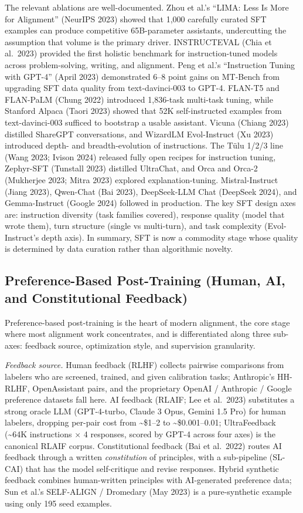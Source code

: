 The relevant ablations are well-documented. Zhou et al.'s ``LIMA: Less Is More for Alignment'' (NeurIPS 2023) showed that 1,000 carefully curated SFT examples can produce competitive 65B-parameter assistants, undercutting the assumption that volume is the primary driver. INSTRUCTEVAL (Chia et al.~2023) provided the first holistic benchmark for instruction-tuned models across problem-solving, writing, and alignment. Peng et al.'s ``Instruction Tuning with GPT-4'' (April 2023) demonstrated 6--8 point gains on MT-Bench from upgrading SFT data quality from text-davinci-003 to GPT-4. FLAN-T5 and FLAN-PaLM (Chung 2022) introduced 1,836-task multi-task tuning, while Stanford Alpaca (Taori 2023) showed that 52K self-instructed examples from text-davinci-003 sufficed to bootstrap a usable assistant. Vicuna (Chiang 2023) distilled ShareGPT conversations, and WizardLM Evol-Instruct (Xu 2023) introduced depth- and breadth-evolution of instructions. The Tülu 1/2/3 line (Wang 2023; Ivison 2024) released fully open recipes for instruction tuning, Zephyr-SFT (Tunstall 2023) distilled UltraChat, and Orca and Orca-2 (Mukherjee 2023; Mitra 2023) explored explanation-tuning. Mistral-Instruct (Jiang 2023), Qwen-Chat (Bai 2023), DeepSeek-LLM Chat (DeepSeek 2024), and Gemma-Instruct (Google 2024) followed in production. The key SFT design axes are: instruction diversity (task families covered), response quality (model that wrote them), turn structure (single vs multi-turn), and task complexity (Evol-Instruct's depth axis). In summary, SFT is now a commodity stage whose quality is determined by data curation rather than algorithmic novelty.

\subsection{Preference-Based Post-Training (Human, AI, and Constitutional Feedback)}\label{preference-based-post-training-human-ai-and-constitutional-feedback}

Preference-based post-training is the heart of modern alignment, the core stage where most alignment work concentrates, and is differentiated along three sub-axes: feedback source, optimization style, and supervision granularity.

\emph{Feedback source.} Human feedback (RLHF) collects pairwise comparisons from labelers who are screened, trained, and given calibration tasks; Anthropic's HH-RLHF, OpenAssistant pairs, and the proprietary OpenAI / Anthropic / Google preference datasets fall here. AI feedback (RLAIF; Lee et al.~2023) substitutes a strong oracle LLM (GPT-4-turbo, Claude 3 Opus, Gemini 1.5 Pro) for human labelers, dropping per-pair cost from \textasciitilde\$1--2 to \textasciitilde\$0.001--0.01; UltraFeedback (\textasciitilde64K instructions × 4 responses, scored by GPT-4 across four axes) is the canonical RLAIF corpus. Constitutional feedback (Bai et al.~2022) routes AI feedback through a written \emph{constitution} of principles, with a sub-pipeline (SL-CAI) that has the model self-critique and revise responses. Hybrid synthetic feedback combines human-written principles with AI-generated preference data; Sun et al.'s SELF-ALIGN / Dromedary (May 2023) is a pure-synthetic example using only 195 seed examples.


